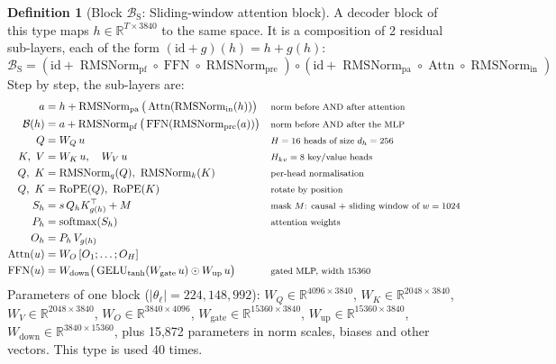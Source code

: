 \documentclass[10pt,a4paper]{article}
\newcommand{\op}[1]{\operatorname{#1}}
\theoremstyle{definition}
\newtheorem{definition}{Definition}[section]
\begin{document}
\begin{definition}[Block $\mathcal{B}_{\mathrm{S}}$: Sliding-window attention block]
A decoder block of this type maps $h\in\mathbb{R}^{T\times 3840}$ to the same space. It is a composition of 2 residual sub-layers, each of the form $(\mathrm{id}+g)(h)=h+g(h)$:
\begin{equation}
  \mathcal{B}_{\mathrm{S}} = (\mathrm{id}+\op{RMSNorm}_{\mathrm{pf}}\circ\op{FFN}\circ \op{RMSNorm}_{\mathrm{pre}})\circ(\mathrm{id}+\op{RMSNorm}_{\mathrm{pa}}\circ \op{Attn}\circ \op{RMSNorm}_{\mathrm{in}})
\end{equation}
Step by step, the sub-layers are:
\begin{align*}
  a &= h + \op{RMSNorm}_{\mathrm{pa}}\big(\op{Attn}(\op{RMSNorm}_{\mathrm{in}}(h))\big) && \text{\footnotesize norm before AND after attention} \\
  \mathcal{B}(h) &= a + \op{RMSNorm}_{\mathrm{pf}}\big(\op{FFN}(\op{RMSNorm}_{\mathrm{pre}}(a))\big) && \text{\footnotesize norm before AND after the MLP} \\
  Q &= W_Q\,u && \text{\footnotesize $H=16$ heads of size $d_h=256$} \\
  K,\ V &= W_K\,u,\quad W_V\,u && \text{\footnotesize $H_{kv}=8$ key/value heads} \\
  Q,\ K &= \op{RMSNorm}_q(Q),\ \op{RMSNorm}_k(K) && \text{\footnotesize per-head normalisation} \\
  Q,\ K &= \op{RoPE}(Q),\ \op{RoPE}(K) && \text{\footnotesize rotate by position} \\
  S_h &= s\, Q_h K_{g(h)}^{\top} + M && \text{\footnotesize mask $M$: causal + sliding window of $w=1024$} \\
  P_h &= \op{softmax}(S_h) && \text{\footnotesize attention weights} \\
  O_h &= P_h\, V_{g(h)} \\
  \op{Attn}(u) &= W_O\,[O_1;\dots;O_H] \\
  \op{FFN}(u) &= W_{\mathrm{down}}\big(\op{GELU}_{\tanh}(W_{\mathrm{gate}}\,u)\odot W_{\mathrm{up}}\,u\big) && \text{\footnotesize gated MLP, width 15360}
\end{align*}
Parameters of one block ($|\theta_\ell|=224{,}148{,}992$): $W_Q\in\mathbb{R}^{4096\times3840}$, $W_K\in\mathbb{R}^{2048\times3840}$, $W_V\in\mathbb{R}^{2048\times3840}$, $W_O\in\mathbb{R}^{3840\times4096}$, $W_{\mathrm{gate}}\in\mathbb{R}^{15360\times3840}$, $W_{\mathrm{up}}\in\mathbb{R}^{15360\times3840}$, $W_{\mathrm{down}}\in\mathbb{R}^{3840\times15360}$, plus 15,872 parameters in norm scales, biases and other vectors. This type is used 40 times.
\end{definition}
\end{document}
